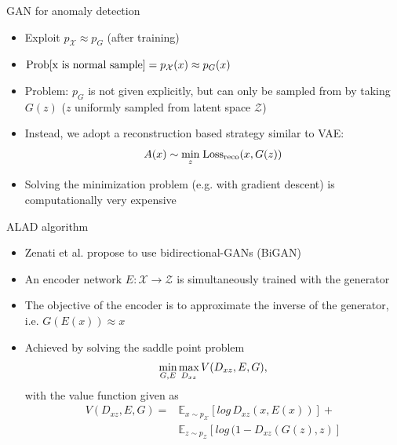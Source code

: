 \documentclass{beamer}
\begin{document}
\begin{frame}{GAN for anomaly detection}
  \begin{itemize}
      \item<1-> Exploit $p_\mathcal{X}\approx p_G$ (after training)
      \item<2-> $\textup{Prob[x \textup{is normal sample}]}=p_\mathcal{X}(x) \approx p_G(x)$
      \item<3-> Problem: $p_G$ is not given explicitly, but can only be sampled from by taking $G(z)$ ($z$ uniformly sampled from latent space $\mathcal{Z}$)
      \item<4-> Instead, we adopt a reconstruction based strategy similar to VAE:
      \begin{equation}
        A(x) \sim \underset{z}{\textup{min}} \; \textup{Loss}_{\textup{reco}}(x, G(z))
      \end{equation}
      \item<5-> Solving the minimization problem (e.g. with gradient descent) is computationally very expensive
  \end{itemize}
\end{frame}

\begin{frame}{ALAD algorithm}
  \begin{itemize}
      \item<1-> Zenati et al. propose to use bidirectional-GANs (BiGAN)
      \item<2-> An encoder network $E: \mathcal{X} \rightarrow \mathcal{Z}$ is simultaneously trained with the generator
      \item<3-> The objective of the encoder is to approximate the inverse of the generator, i.e. $G(E(x))\approx x$
      \item<4-> Achieved by solving the saddle point problem
      \begin{align}
    \underset{G,E}{\textup{min}}\, \underset{D_{xz}}{\textup{max}}\, V(D_{xz},E,G),
\end{align}
with the value function given as
\begin{equation}
\begin{split}
    V(D_{xz},E,G)=& \mathbb{E}_{x\sim p_\mathcal{X}}[log\,D_{xz}(x, E(x))] + \\
    & \mathbb{E}_{z\sim p_\mathcal{Z}}[log\,(1-D_{xz}(G(z), z)]
\end{split}
\end{equation}
  \end{itemize}
\end{frame}
\end{document}
